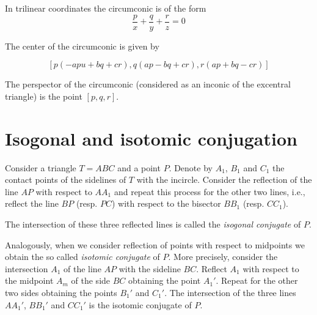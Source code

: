 In trilinear coordinates the circumconic is of the form
\[ \frac{p}{x}+\frac{q}{y}+\frac{r}{z}=0\]

 The center of the circumconic is given by 

 \[ [p (-a p u + b q + c r), q  (a p - b q + c r),   r (a p + b q - cr)] \]
 
 The perspector of the circumconic (considered as an inconic of the excentral triangle)  is the point $[p,q,r]$.
 
\section{Isogonal and isotomic conjugation}
	
Consider a triangle $T=ABC$ and a point $P$. Denote by $A_1$, $B_1$ and $C_1$ the contact points of the sidelines of $T$ with the incircle. Consider the reflection of the line $AP$ with respect to $AA_1$ and repeat this process for the other two lines, i.e., reflect the line $BP$ (resp. $PC$) with respect to the bisector $BB_1$ (resp. $CC_1$).

The intersection of these three reflected lines is called the {\em isogonal conjugate} of $P$. 
	
Analogously, when we consider reflection of points  with respect to midpoints   we obtain the so called {\em isotomic conjugate} of $P$. More precisely, consider the intersection $A_1$ of the line $AP$ with the sideline $BC$. Reflect $A_1$ with respect to the midpoint $A_m$ of the side $BC$ obtaining the point $A_1'$. Repeat for the other two sides obtaining the points $B_1'$ and $C_1'$. The intersection of the three lines $AA_1'$, $BB_1'$ and $CC_1'$ is the isotomic conjugate of $P$.
	
